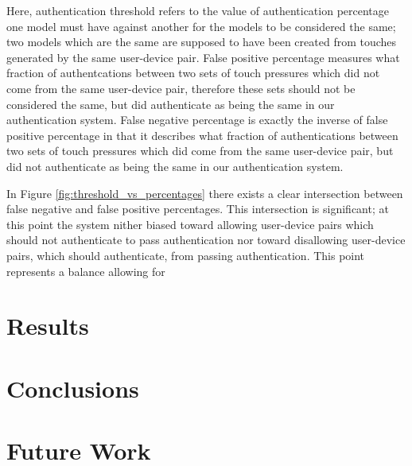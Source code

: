 \documentclass{acm_proc_article-sp}
\begin{document}
Here, authentication threshold refers to the value of authentication percentage one model must have against another for the models to be considered the same; two models which are the same are supposed to have been created from touches generated by the same user-device pair.
False positive percentage measures what fraction of authentcations between two sets of touch pressures which did not come from the same user-device pair, therefore these sets should not be considered the same, but did authenticate as being the same in our authentication system.
False negative percentage is exactly the inverse of false positive percentage in that it describes what fraction of authentications between two sets of touch pressures which did come from the same user-device pair, but did not authenticate as being the same in our authentication system.

In Figure \ref{fig:threshold_vs_percentages} there exists a clear intersection between false negative and false positive percentages. This intersection is significant; at this point the system nither biased toward allowing user-device pairs which should not authenticate to pass authentication nor toward disallowing user-device pairs, which should authenticate, from passing authentication. This point represents a balance allowing for %

\section{Results}
\label{sec:results}


\section{Conclusions}
\label{sec:conclusions}


\section{Future Work}
\label{sec:futurework}



\end{document}
